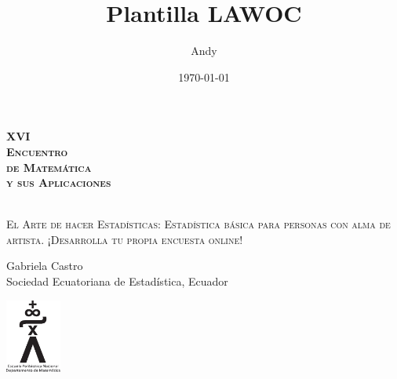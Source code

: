 \documentclass[a5paper,doc,10pt,noapacite]{apa6}
\title{Plantilla LAWOC}
\author{Andy}
\date{\today}
\begin{document}
\pagestyle{empty}
{
	\HUGE
	{\bf\textsc{XVI \\[0.5cm] Encuentro  \\[0.5cm] de Matemática \\[0.5cm] y sus Aplicaciones \\[0.5cm] }}
	\\[1cm]
	\large
	
	\vspace{-2.cm}
	\begin{center}
		
		\textsc{El Arte de hacer Estadísticas: Estadística básica para personas con alma de artista. ¡Desarrolla tu propia encuesta online!}
		
		\vspace{1.25\baselineskip}
		
		Gabriela Castro
		\\
		
		\normalsize
		Sociedad Ecuatoriana de Estadística, Ecuador
	\end{center}

}

\vspace{1.5cm}
\begin{center}
	\includegraphics[height=2.45cm]{Logos/DM-EPN}
\end{center}
\end{document}
